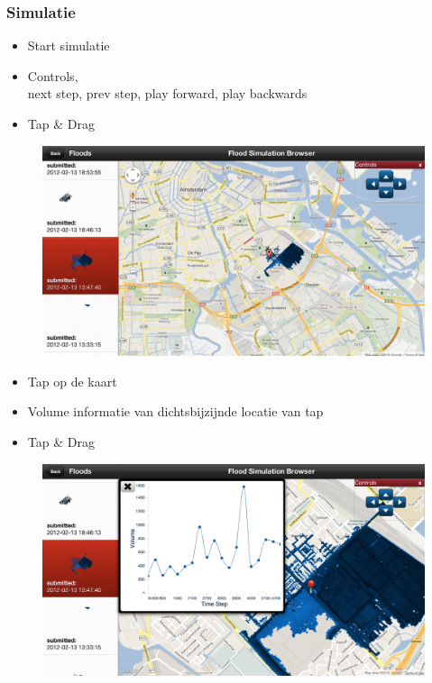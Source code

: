 \documentclass[10pt,a4paper]{beamer}
\begin{document}
\begin{frame}
\frametitle{Simulatie}
\begin{itemize}
\item Start simulatie
\item Controls, \\
        next step, prev step, play forward, play backwards
\item Tap \& Drag
\end{itemize}
\begin{figure}
\includegraphics[scale=0.2]{ui/simselected_full.png}
\end{figure}
\end{frame}
\begin{frame}
\begin{itemize}
\frametitle{Volume Chart}
\item Tap op de kaart
\item Volume informatie van dichtsbijzijnde locatie van tap
\item Tap \& Drag
\end{itemize}
\begin{figure}
\includegraphics[scale=0.2]{ui/floodchart.png}
\end{figure}
\end{frame}
\end{document}
